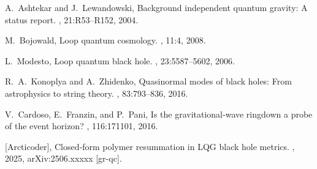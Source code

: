 \documentclass[11pt]{article}
\begin{document}
\begin{thebibliography}{9}

A.~Ashtekar and J.~Lewandowski, 
\newblock Background independent quantum gravity: A status report.
, 21:R53–R152, 2004.

M.~Bojowald,
\newblock Loop quantum cosmology.
, 11:4, 2008.

L.~Modesto,
\newblock Loop quantum black hole.
, 23:5587–5602, 2006.

R.~A.~Konoplya and A.~Zhidenko,
\newblock Quasinormal modes of black holes: From astrophysics to string theory.
, 83:793–836, 2016.

V.~Cardoso, E.~Franzin, and P.~Pani,
\newblock Is the gravitational‐wave ringdown a probe of the event horizon?
, 116:171101, 2016.

[Arcticoder],
\newblock Closed‐form polymer resummation in LQG black hole metrics.
, 2025, arXiv:2506.xxxxx [gr-qc].

\end{thebibliography}
\end{document}
